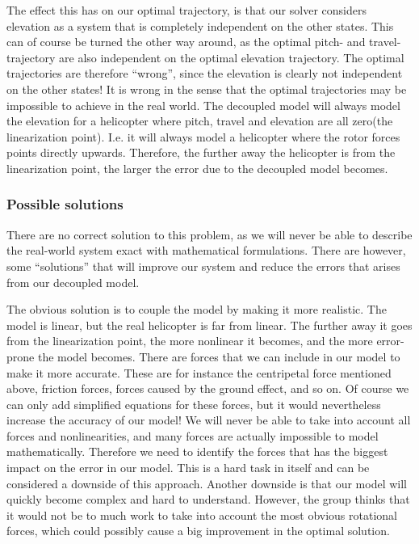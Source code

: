 \documentclass[../main.tex]{subfiles}
\begin{document}
The effect this has on our optimal trajectory, is that our solver considers elevation as a system that is completely independent on the other states. This can of course be turned the other way around, as the optimal pitch- and travel-trajectory are also independent on the optimal elevation trajectory. The optimal trajectories are therefore ``wrong'', since the elevation is clearly not independent on the other states! It is wrong in the sense that the optimal trajectories may be impossible to achieve in the real world. The decoupled model will always model the elevation for a helicopter where pitch, travel and elevation are all zero(the linearization point). I.e. it will always model a helicopter where the rotor forces points directly upwards. Therefore, the further away the helicopter is from the linearization point, the larger the error due to the decoupled model becomes. 

\subsubsection{Possible solutions}
There are no correct solution to this problem, as we will never be able to describe the real-world system exact with mathematical formulations. There are however, some ``solutions'' that will improve our system and reduce the errors that arises from our decoupled model.

The obvious solution is to couple the model by making it more realistic. The model is linear, but the real helicopter is far from linear. The further away it goes from the linearization point, the more nonlinear it becomes, and the more error-prone the model becomes. There are forces that we can include in our model to make it more accurate. These are for instance the centripetal force mentioned above, friction forces, forces caused by the ground effect, and so on. Of course we can only add simplified equations for these forces, but it would nevertheless increase the accuracy of our model! We will never be able to take into account all forces and nonlinearities, and many forces are actually impossible to model mathematically. Therefore we need to identify the forces that has the biggest impact on the error in our model. This is a hard task in itself and can be considered a downside of this approach. Another downside is that our model will quickly become complex and hard to understand. However, the group thinks that it would not be to much work to take into account the most obvious rotational forces, which could possibly cause a big improvement in the optimal solution.
\end{document}
